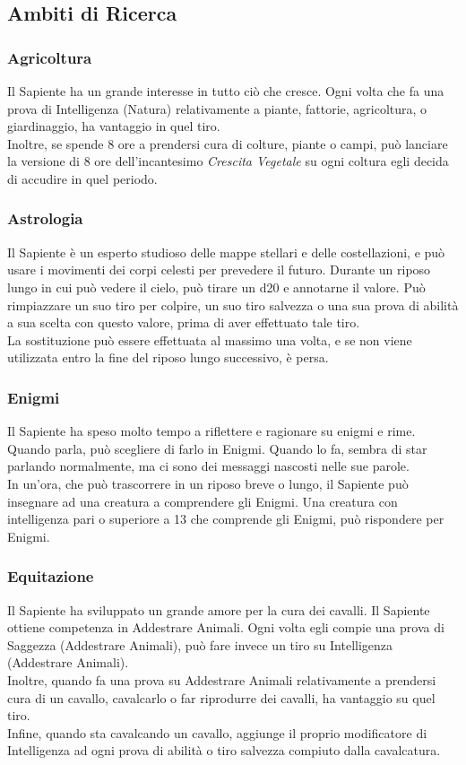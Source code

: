 \subsection{Ambiti di Ricerca}

\subsubsection{Agricoltura}
Il Sapiente ha un grande interesse in tutto ciò che cresce. Ogni volta che fa una prova di Intelligenza (Natura) relativamente a piante, fattorie, agricoltura, o giardinaggio, ha vantaggio in quel tiro. \\
Inoltre, se spende 8 ore a prendersi cura di colture, piante o campi, può lanciare la versione di 8 ore dell'incantesimo \textit{Crescita Vegetale} su ogni coltura egli decida di accudire in quel periodo.

\subsubsection{Astrologia}
Il Sapiente è un esperto studioso delle mappe stellari e delle costellazioni, e può usare i movimenti dei corpi celesti per prevedere il futuro. Durante un riposo lungo in cui può vedere il cielo, può tirare un d20 e annotarne il valore. Può rimpiazzare un suo tiro per colpire, un suo tiro salvezza o una sua prova di abilità a sua scelta con questo valore, prima di aver effettuato tale tiro.\\
La sostituzione può essere effettuata al massimo una volta, e se non viene utilizzata entro la fine del riposo lungo successivo, è persa.

\subsubsection{Enigmi}
Il Sapiente ha speso molto tempo a riflettere e ragionare su enigmi e rime. Quando parla, può scegliere di farlo in Enigmi. Quando lo fa, sembra di star parlando normalmente, ma ci sono dei messaggi nascosti nelle sue parole. \\
In un'ora, che può trascorrere in un riposo breve o lungo, il Sapiente può insegnare ad una creatura a comprendere gli Enigmi. Una creatura con intelligenza pari o superiore a 13 che comprende gli Enigmi, può rispondere per Enigmi.

\subsubsection{Equitazione}
Il Sapiente ha sviluppato un grande amore per la cura dei cavalli. Il Sapiente ottiene competenza in Addestrare Animali. Ogni volta egli compie una prova di Saggezza (Addestrare Animali), può fare invece un tiro su Intelligenza (Addestrare Animali).\\
Inoltre, quando fa una prova su Addestrare Animali relativamente a prendersi cura di un cavallo, cavalcarlo o far riprodurre dei cavalli, ha vantaggio su quel tiro.\\
Infine, quando sta cavalcando un cavallo, aggiunge il proprio modificatore di Intelligenza ad ogni prova di abilità o tiro salvezza compiuto dalla cavalcatura.

